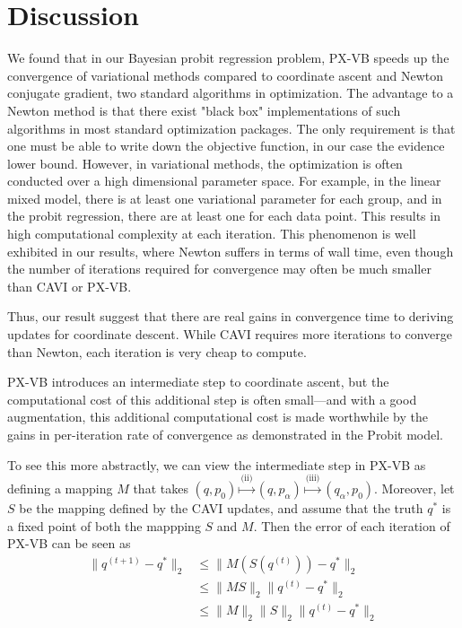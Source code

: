 \documentclass{article}
\begin{document}
\section{Discussion}
We found that in our Bayesian probit regression problem, PX-VB speeds up the convergence of variational methods compared to coordinate ascent and Newton conjugate gradient, two standard algorithms in optimization. The advantage to a Newton method is that there exist "black box" implementations of such algorithms in most standard optimization packages. The only requirement is that one must be able to write down the objective function, in our case the evidence lower bound. However, in variational methods, the optimization is often conducted over a high dimensional parameter space. For example, in the linear mixed model, there is at least one variational parameter for each group, and in the probit regression, there are at least one for each data point. This results in high computational complexity at each iteration. This phenomenon is well exhibited in our results, where Newton suffers in terms of wall time, even though the number of iterations required for convergence may often be much smaller than CAVI or PX-VB. 

Thus, our result suggest that there are real gains in convergence time to deriving updates for coordinate descent. While CAVI requires more iterations to converge than Newton, each iteration is very cheap to compute. 


PX-VB introduces an intermediate step to coordinate ascent, but the computational cost of this additional step is often small---and with a good augmentation, this additional computational cost is made worthwhile by the gains in per-iteration rate of convergence as demonstrated in the Probit model.

To see this more abstractly, we can view the intermediate step in PX-VB as defining a mapping $M$ that takes $(q, p_0) \stackrel{\text{(ii)}}{\mapsto} (q, p_\alpha) \stackrel{\text{(iii)}}{\mapsto} (q_\alpha, p_0)$. Moreover, let $S$ be the mapping defined by the CAVI updates, and assume that the truth $q^*$ is a fixed point of both the mappping $S$ and $M$. Then the error of each iteration of PX-VB can be seen as
\begin{align}
\|q^{(t+1)} - q^*\|_2 &\leq \| M(S(q^{(t)})) - q^*\|_2 \\
&\leq \|MS\|_2 \|q^{(t)} - q^*\|_2\\
&\leq \|M\|_2\|S\|_2 \|q^{(t)} - q^*\|_2
\end{align}
\end{document}
